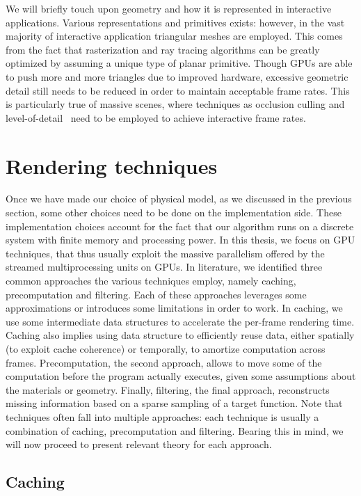 We will briefly touch upon geometry and how it is represented in interactive applications. Various representations and primitives exists: however, in the vast majority of interactive application triangular meshes are employed. This comes from the fact that rasterization and ray tracing algorithms can be greatly optimized by assuming a unique type of planar primitive. Though GPUs are able to push more and more triangles due to improved hardware, excessive geometric detail still needs to be reduced in order to maintain acceptable frame rates. This is particularly true of massive scenes, where techniques as occlusion culling and level-of-detail~\cite{Clark1976} need to be employed to achieve interactive frame rates. 

\section{Rendering techniques}
%
Once we have made our choice of physical model, as we discussed in the previous section,  some other choices need to be done on the implementation side. These implementation choices account for the fact that our algorithm runs on a discrete system with finite memory and processing power. In this thesis, we focus on GPU techniques, that thus usually exploit the massive parallelism offered by the streamed multiprocessing units on GPUs. In literature, we identified three common approaches the various techniques employ, namely caching, precomputation and filtering. Each of these approaches leverages some approximations or introduces some limitations in order to work. In caching, we use some intermediate data structures to accelerate the per-frame rendering time. Caching also implies using data structure to efficiently reuse data, either spatially (to exploit cache coherence) or temporally, to amortize computation across frames. Precomputation, the second approach, allows to move some of the computation before the program actually executes, given some assumptions about the materials or geometry. Finally, filtering, the final approach, reconstructs missing information based on a sparse sampling of a target function. Note that techniques often fall into multiple approaches: each technique is usually a combination of caching, precomputation and filtering. Bearing this in mind, we will now proceed to present relevant theory for each approach. 

%
\subsection{Caching}

